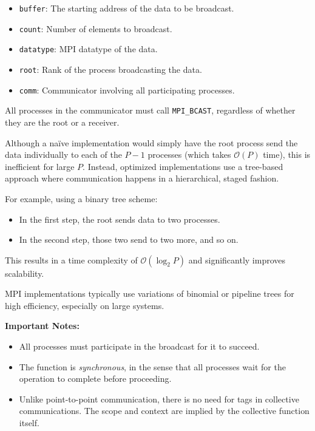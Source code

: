 \documentclass[12pt]{book}
\begin{document}
\begin{itemize}
    \item \texttt{buffer}: The starting address of the data to be broadcast.
    \item \texttt{count}: Number of elements to broadcast.
    \item \texttt{datatype}: MPI datatype of the data.
    \item \texttt{root}: Rank of the process broadcasting the data.
    \item \texttt{comm}: Communicator involving all participating processes.
\end{itemize}

All processes in the communicator must call \texttt{MPI\_BCAST}, regardless of whether they are the root or a receiver.

\vspace{1em}
Although a naïve implementation would simply have the root process send the data individually to each of the $P - 1$ processes (which takes $\mathcal{O}(P)$ time), this is inefficient for large $P$. Instead, optimized implementations use a tree-based approach where communication happens in a hierarchical, staged fashion.

For example, using a binary tree scheme:
\begin{itemize}
    \item In the first step, the root sends data to two processes.
    \item In the second step, those two send to two more, and so on.
\end{itemize}
This results in a time complexity of $\mathcal{O}(\log_2 P)$ and significantly improves scalability.

MPI implementations typically use variations of binomial or pipeline trees for high efficiency, especially on large systems.

\vspace{1em}
\textbf{Important Notes:}
\begin{itemize}
    \item All processes must participate in the broadcast for it to succeed.
    \item The function is \emph{synchronous}, in the sense that all processes wait for the operation to complete before proceeding.
    \item Unlike point-to-point communication, there is no need for tags in collective communications. The scope and context are implied by the collective function itself.
\end{itemize}
\end{document}
